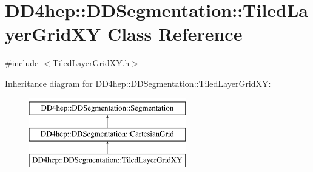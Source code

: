\hypertarget{class_d_d4hep_1_1_d_d_segmentation_1_1_tiled_layer_grid_x_y}{}\section{D\+D4hep\+:\+:D\+D\+Segmentation\+:\+:Tiled\+Layer\+Grid\+XY Class Reference}
\label{class_d_d4hep_1_1_d_d_segmentation_1_1_tiled_layer_grid_x_y}


{\ttfamily \#include $<$Tiled\+Layer\+Grid\+X\+Y.\+h$>$}

Inheritance diagram for D\+D4hep\+:\+:D\+D\+Segmentation\+:\+:Tiled\+Layer\+Grid\+XY\+:\begin{figure}[H]
\begin{center}
\leavevmode
\includegraphics[height=3.000000cm]{class_d_d4hep_1_1_d_d_segmentation_1_1_tiled_layer_grid_x_y}
\end{center}
\end{figure}
